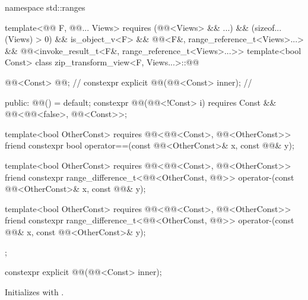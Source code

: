 %
\begin{codeblock}
namespace std::ranges {
  template<@@ F, @@... Views>
    requires (@@<Views> && ...) && (sizeof...(Views) > 0) && is_object_v<F> &&
              @@<F&, range_reference_t<Views>...> &&
              @@<invoke_result_t<F&, range_reference_t<Views>...>>
  template<bool Const>
  class zip_transform_view<F, Views...>::@@ {
    @@<Const> @@;                                     // \expos
    constexpr explicit @@(@@<Const> inner);         // \expos

  public:
    @@() = default;
    constexpr @@(@@<!Const> i)
      requires Const && @@<@@<false>, @@<Const>>;

    template<bool OtherConst>
      requires @@<@@<Const>, @@<OtherConst>>
    friend constexpr bool operator==(const @@<OtherConst>& x, const @@& y);

    template<bool OtherConst>
      requires @@<@@<Const>, @@<OtherConst>>
    friend constexpr range_difference_t<@@<OtherConst, @@>>
      operator-(const @@<OtherConst>& x, const @@& y);

    template<bool OtherConst>
      requires @@<@@<Const>, @@<OtherConst>>
    friend constexpr range_difference_t<@@<OtherConst, @@>>
      operator-(const @@& x, const @@<OtherConst>& y);
  };
}
\end{codeblock}

\begin{itemdecl}
constexpr explicit @@(@@<Const> inner);
\end{itemdecl}

\begin{itemdescr}
\pnum
\effects
Initializes  with .
\end{itemdescr}

